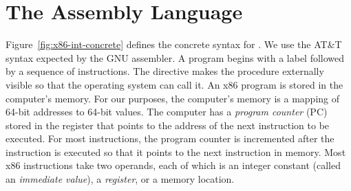 \documentclass[7x10]{TimesAPriori_MIT}%
\numberwithin{theorem}{chapter}
\numberwithin{definition}{chapter}
\numberwithin{equation}{chapter}
\begin{document}
\section{The \LangXInt{} Assembly Language}
\label{sec:x86}

Figure~\ref{fig:x86-int-concrete} defines the concrete syntax for
\LangXInt{}.  We use the AT\&T syntax expected by the GNU
assembler.
%
A program begins with a  label followed by a sequence of
instructions. The  directive makes the  procedure
externally visible so that the operating system can call it.
%
An x86 program is stored in the computer's memory.  For our purposes,
the computer's memory is a mapping of 64-bit addresses to 64-bit
values.  The computer has a \emph{program counter}
(PC) stored in the
 register that points to the address of the next instruction
to be executed.  For most instructions, the program counter is
incremented after the instruction is executed so that it points to the
next instruction in memory. Most x86 instructions take two operands,
each of which is an integer constant (called an \emph{immediate
  value}), a
\emph{register}, or a memory location.

\newcommand{\allregisters}{\key{rsp} \MID \key{rbp} \MID \key{rax} \MID \key{rbx} \MID \key{rcx}
              \MID \key{rdx} \MID \key{rsi} \MID \key{rdi} \MID \\
              && \key{r8} \MID \key{r9} \MID \key{r10}
              \MID \key{r11} \MID \key{r12} \MID \key{r13}
              \MID \key{r14} \MID \key{r15}}

\newcommand{\GrammarXIntRacket}{
\begin{array}{rcl}
\Reg &::=& \allregisters{} \\
\Arg &::=&  \key{\$}\Int \MID \key{\%}\Reg \MID \Int\key{(}\key{\%}\Reg\key{)}\\
\Instr &::=& \key{addq} \; \Arg\key{,} \Arg \MID
      \key{subq} \; \Arg\key{,} \Arg \MID
      \key{negq} \; \Arg \MID \key{movq} \; \Arg\key{,} \Arg \MID \\
  &&  \key{pushq}\;\Arg \MID \key{popq}\;\Arg \MID 
      \key{callq} \; \mathit{label} \MID
      \key{retq} \MID
      \key{jmp}\,\itm{label} \MID \\
  && \itm{label}\key{:}\; \Instr 
\end{array}
}

\newcommand{\GrammarXIntPython}{
\begin{array}{rcl}
\Reg &::=& \allregisters{} \\
\Arg &::=&  \key{\$}\Int \MID \key{\%}\Reg \MID \Int\key{(}\key{\%}\Reg\key{)}\\
\Instr &::=& \key{addq} \; \Arg\key{,} \Arg \MID
      \key{subq} \; \Arg\key{,} \Arg \MID
      \key{negq} \; \Arg \MID \key{movq} \; \Arg\key{,} \Arg \MID \\
  &&  \key{pushq}\;\Arg \MID \key{popq}\;\Arg \MID 
      \key{callq} \; \mathit{label} \MID \key{retq} 
\end{array}
}
\end{document}
